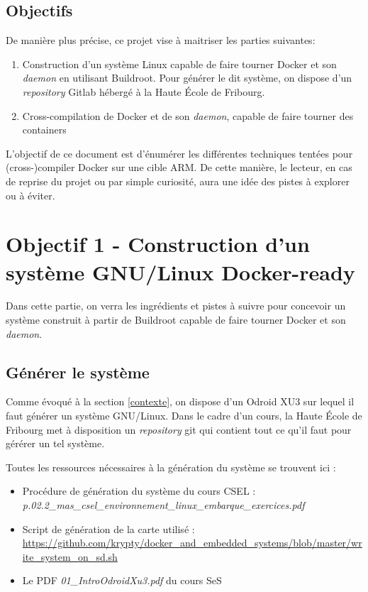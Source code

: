 \documentclass[11pt,a4paper,oneside]{report}
\begin{document}
\section{Objectifs}

De manière plus précise, ce projet vise à maitriser les parties suivantes:

\begin{enumerate}
  \item Construction d'un système Linux capable de faire tourner Docker et son \emph{daemon} en utilisant Buildroot. Pour générer le dit système, on dispose d'un \emph{repository} Gitlab hébergé à la Haute École de Fribourg.

  \item Cross-compilation de Docker et de son \emph{daemon}, capable de faire tourner des containers
\end{enumerate}

L'objectif de ce document est d'énumérer les différentes techniques tentées pour (cross-)compiler Docker sur une cible ARM. De cette manière, le lecteur, en cas de reprise du projet ou par simple curiosité, aura une idée des pistes à explorer ou à éviter.



\chapter{Objectif 1 - Construction d'un système GNU/Linux Docker-ready}

Dans cette partie, on verra les ingrédients et pistes à suivre pour concevoir un système construit à partir de Buildroot capable de faire tourner Docker et son \emph{daemon}.

\section{Générer le système}

Comme évoqué à la section \ref{contexte}, on dispose d'un Odroid XU3 sur lequel il faut générer un système GNU/Linux. Dans le cadre d'un cours, la Haute École de Fribourg met à disposition un \emph{repository} git qui contient tout ce qu'il faut pour gérérer un tel système.

Toutes les ressources nécessaires à la génération du système se trouvent ici :

\begin{itemize}
  \item Procédure de génération du système du cours CSEL : \emph{\newline p.02.2\_mas\_csel\_environnement\_linux\_embarque\_exercices.pdf}
  \item Script de génération de la carte utilisé : \url{https://github.com/krypty/docker\_and\_embedded\_systems/blob/master/write\_system\_on\_sd.sh}
  \item Le PDF \emph{01\_IntroOdroidXu3.pdf} du cours SeS
\end{itemize}
\end{document}
